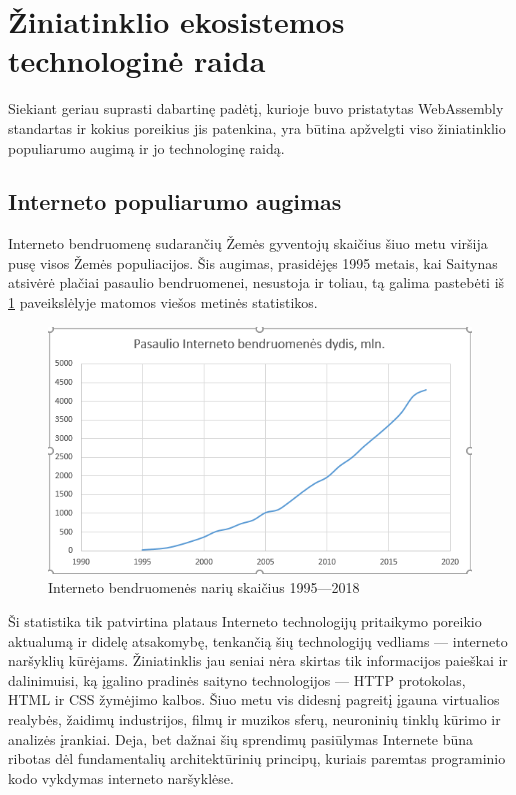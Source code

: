 \documentclass{VUMIFPSkursinis}
\begin{document}
\section{Žiniatinklio ekosistemos technologinė raida}

Siekiant geriau suprasti dabartinę padėtį, kurioje buvo pristatytas WebAssembly standartas ir kokius poreikius jis patenkina, yra būtina apžvelgti viso žiniatinklio populiarumo augimą ir jo technologinę raidą.

\subsection{Interneto populiarumo augimas}

Interneto bendruomenę sudarančių Žemės gyventojų skaičius šiuo metu viršija pusę visos Žemės populiacijos. Šis augimas, prasidėjęs 1995 metais, kai Saitynas atsivėrė plačiai pasaulio bendruomenei, nesustoja ir toliau, tą galima pastebėti iš \ref{fig:internet_usage} paveikslėlyje matomos viešos metinės statistikos.

\begin{figure}[h!]
  \includegraphics[scale=1]{interneto_naudojimo_statistika.png}
  \caption{Interneto bendruomenės narių skaičius 1995—2018 \cite{IWS19}}
  \label{fig:internet_usage}
\end{figure}

Ši statistika tik patvirtina plataus Interneto technologijų pritaikymo poreikio aktualumą ir didelę atsakomybę, tenkančią šių technologijų vedliams — interneto naršyklių kūrėjams. Žiniatinklis jau seniai nėra skirtas tik informacijos paieškai ir dalinimuisi, ką įgalino pradinės saityno technologijos — HTTP protokolas, HTML ir CSS žymėjimo kalbos. Šiuo metu vis didesnį pagreitį įgauna virtualios realybės, žaidimų industrijos, filmų ir muzikos sferų, neuroninių tinklų kūrimo ir analizės įrankiai. Deja, bet dažnai šių sprendimų pasiūlymas Internete būna ribotas dėl fundamentalių architektūrinių principų, kuriais paremtas programinio kodo vykdymas interneto naršyklėse.
\end{document}
